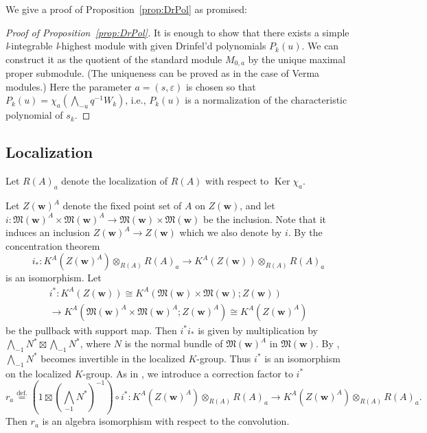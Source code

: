 \documentclass[12pt]{amsart}
\def\frak{\mathfrak}
\theoremstyle{definition}
\theoremstyle{remark}
\numberwithin{equation}{subsection}
\newcommand{\propref}[1]{Proposition~\ref{#1}}
\newcommand{\defeq}{\overset{\operatorname{\scriptstyle def.}}{=}}
\newcommand{\Ker}{\operatorname{Ker}}
\newcommand{\M}{{\frak M}} %
\newcommand{\bw}{{\mathbf w}} %
\newcommand{\Wedge}{{\textstyle \bigwedge}}
\newcommand{\Zw}{Z(\bw)}
\newcommand{\Mw}{\M(\bw)}
\begin{document}
We give a proof of \propref{prop:DrPol} as promised:
\begin{proof}[Proof of \propref{prop:DrPol}]
It is enough to show that there exists a simple {\it l\/}-integrable {\it
l\/}-highest module with given Drinfel'd polynomials $P_k(u)$. We can
construct it as the quotient of the standard module $M_{0,a}$ by the
unique maximal proper submodule. (The uniqueness can be proved as in the
case of Verma modules.) Here the parameter $a = (s,\varepsilon)$ is
chosen so that $P_k(u) = \chi_a\left(\Wedge_{-u} q^{-1} W_k\right)$,
i.e., $P_k(u)$ is a normalization of the characteristic polynomial of
$s_k$.
\end{proof}

\subsection{Localization}\label{subsec:local}

Let $R(A)_a$ denote the localization of $R(A)$ with respect to
$\Ker\chi_a$.

Let $\Zw^A$ denote the fixed point set of $A$ on
$\Zw$, and let
\(
   i\colon\Mw^A\times\Mw^A
   \to \Mw\times\Mw
\)
be the inclusion. Note that it induces an inclusion
\(
   \Zw^A \to \Zw
\)
which we also denote by $i$.
By the concentration theorem~\cite{Thom}
\begin{equation*}
  i_* \colon K^A(\Zw^A)\otimes_{R(A)} R(A)_a
  \to K^A(\Zw)\otimes_{R(A)} R(A)_a
\end{equation*}
is an isomorphism. Let
\begin{multline*}
  i^*\colon K^A(\Zw)
  \cong K^A(\Mw\times\Mw;\Zw) \\
  \longrightarrow
  K^A(\Mw^A\times\Mw^A;\Zw^A)
  \cong 
  K^A(\Zw^A)
\end{multline*}
be the pullback with support map. Then $i^* i_*$ is given by
multiplication by $\Wedge_{-1} N^*\boxtimes\Wedge_{-1} N^*$, where $N$
is the normal bundle of $\Mw^A$ in $\Mw$. By \cite[5.11.3]{Gi-book},
$\Wedge_{-1} N^*$ becomes invertible in the
localized $K$-group. Thus $i^*$ is an isomorphism on 
the localized $K$-group.
%
As in \cite[5.11.10]{Gi-book}, we introduce a correction factor to $i^*$
\begin{equation*}
   r_a \defeq (1\boxtimes (\Wedge_{-1} N^*)^{-1})\circ i^*
   \colon K^A(\Zw^A)\otimes_{R(A)} R(A)_a
   \to K^A(\Zw^A)\otimes_{R(A)} R(A)_a.
\end{equation*}
Then $r_a$ is an algebra isomorphism with respect to the
convolution.
\end{document}
